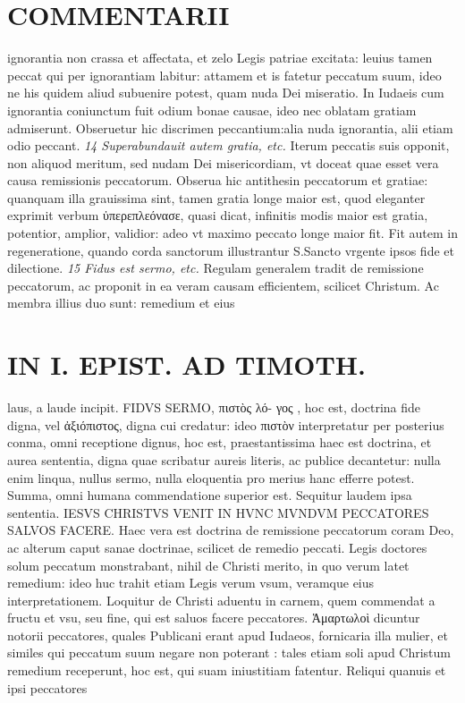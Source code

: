 \documentclass{article}
\begin{document}
\begin{pages}
\section*{COMMENTARII }
\marginpar{[ p.32 ]}\pstart ignorantia non crassa et affectata, et zelo Legis patriae excitata: leuius tamen peccat qui per ignorantiam labitur: attamem et is fatetur peccatum suum, ideo ne his quidem aliud subuenire potest, quam nuda Dei miseratio. In Iudaeis cum ignorantia coniunctum fuit odium bonae causae, ideo nec oblatam gratiam admiserunt. Obseruetur hic discrimen peccantium:alia nuda ignorantia, alii etiam odio peccant.  \pend
\textit{14 Superabundauit autem gratia, etc. }\pstart Iterum peccatis suis opponit, non aliquod meritum, sed nudam Dei misericordiam, vt doceat quae esset vera causa remissionis peccatorum. Obserua hic antithesin peccatorum et gratiae: quanquam illa grauissima sint, tamen gratia longe maior est, quod eleganter exprimit verbum ὐπερεπλεόνασε, quasi dicat, infinitis modis maior est gratia, potentior, amplior, validior: adeo vt maximo peccato longe maior fit. Fit autem in regeneratione, quando corda sanctorum illustrantur S.Sancto vrgente ipsos fide et dilectione.  \pend
\textit{15 Fidus est sermo, etc. }\pstart Regulam generalem tradit de remissione peccatorum, ac proponit in ea veram causam efficientem, scilicet Christum. Ac membra illius duo sunt: remedium et eius  \pend
\section*{IN I. EPIST. AD TIMOTH. }
\marginpar{[ p.33 ]}\pstart laus, a laude incipit. FIDVS SERMO, πιστὸς λό- γος , hoc est, doctrina fide digna, vel ἀξιόπιστος, digna cui credatur: ideo πιστὸν interpretatur per posterius conma, omni receptione dignus, hoc est, praestantissima haec est doctrina, et aurea sententia, digna quae scribatur aureis literis, ac publice decantetur: nulla enim linqua, nullus sermo, nulla eloquentia pro merius hanc efferre potest. Summa, omni humana commendatione superior est.  \pend\pstart Sequitur laudem ipsa sententia. IESVS CHRISTVS VENIT IN HVNC MVNDVM PECCATORES SALVOS FACERE. Haec vera est doctrina de remissione peccatorum coram Deo, ac alterum caput sanae doctrinae, scilicet de remedio peccati. Legis doctores solum peccatum monstrabant, nihil de Christi merito, in quo verum latet remedium: ideo huc trahit etiam Legis verum vsum, veramque eius interpretationem.  \pend\pstart Loquitur de Christi aduentu in carnem, quem commendat a fructu et vsu, seu fine, qui est saluos facere peccatores. Ἁμαρτωλοὶ dicuntur notorii peccatores, quales Publicani erant apud Iudaeos, fornicaria illa mulier, et similes qui peccatum suum negare non poterant : tales etiam soli apud Christum remedium receperunt, hoc est, qui suam iniustitiam fatentur. Reliqui quanuis et ipsi peccatores  \pend

\end{pages}
\end{document}
